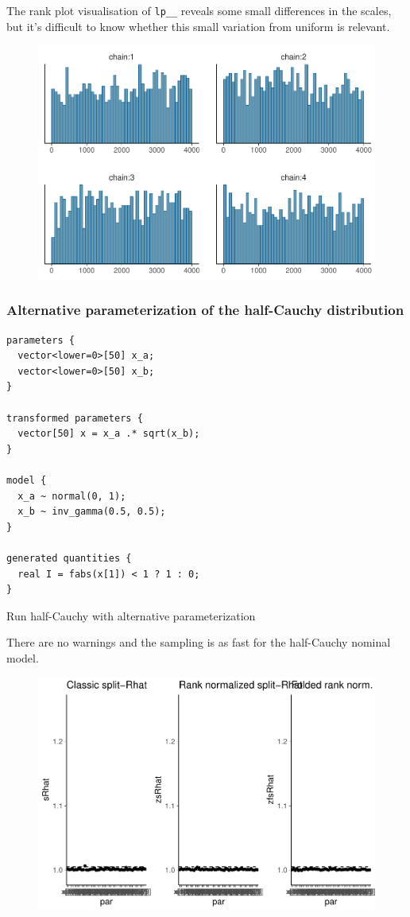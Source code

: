 \documentclass[american,]{article}
\begin{document}
The rank plot visualisation of \texttt{lp\_\_} reveals some small
differences in the scales, but it's difficult to know whether this small
variation from uniform is relevant.

\begin{figure}[tp]
  \centering
  \includegraphics[width=0.6\linewidth]{graphics/hist-fit-half-nom-lp-1.pdf}
\end{figure}

\hypertarget{alternative-parameterization-of-the-half-cauchy-distribution}{%
\subsubsection*{Alternative parameterization of the half-Cauchy
distribution}\label{alternative-parameterization-of-the-half-cauchy-distribution}}

\begin{verbatim}
parameters {
  vector<lower=0>[50] x_a;
  vector<lower=0>[50] x_b;
}

transformed parameters {
  vector[50] x = x_a .* sqrt(x_b);
}

model {
  x_a ~ normal(0, 1);
  x_b ~ inv_gamma(0.5, 0.5);
}

generated quantities {
  real I = fabs(x[1]) < 1 ? 1 : 0;
}
\end{verbatim}

Run half-Cauchy with alternative parameterization

There are no warnings and the sampling is as fast for the half-Cauchy
nominal model.

\begin{figure}[tp]
  \centering
  \includegraphics[width=0.6\linewidth]{graphics/rhat-fit-half-reparam-1.pdf}
\end{figure}
\end{document}
